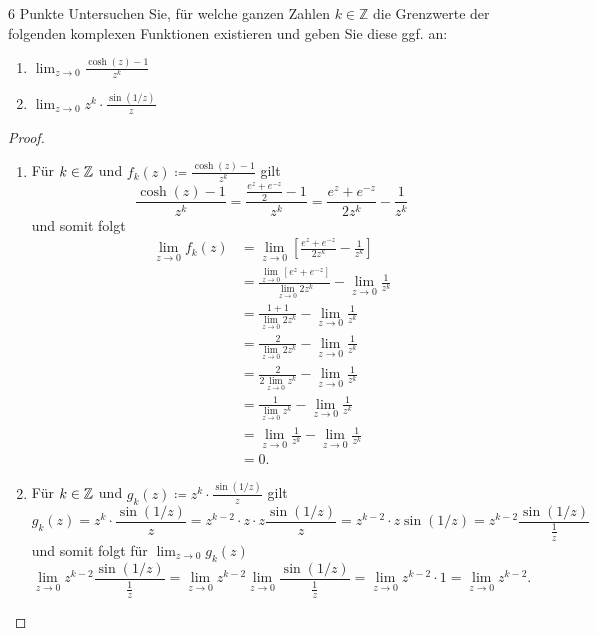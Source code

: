 \documentclass{problemset}
\begin{document}
\begin{problem}[Grenzwerte]{6 Punkte}
Untersuchen Sie, für welche ganzen Zahlen $k \in \mathbb{Z}$ die Grenzwerte der folgenden komplexen Funktionen existieren und geben Sie diese ggf. an:

\begin{enumerate}
	\item $\lim_{z \to 0} \frac{\cosh(z) - 1}{z^k}$

	\item $\lim_{z \to 0} z^k \cdot \frac{\sin(1/z)}{z}$
\end{enumerate}

\begin{proof}
	\leavevmode
	\begin{enumerate}
		\item Für $k \in \mathbb{Z}$ und $f_k(z) \coloneqq \frac{\cosh(z) - 1}{z^k}$ gilt \[
			      \frac{\cosh(z) - 1}{z^k} = \frac{\frac{e^z + e^{-z}}{2} - 1}{z^k} = \frac{e^z + e^{-z}}{2z^k} - \frac{1}{z^k}
		      \] und somit folgt
		      \begin{align*}
			      \lim_{z \to 0} f_k(z) & = \lim_{z \to 0} \left[ \frac{e^z + e^{-z}}{2z^k} - \frac{1}{z^k} \right]                               \\
			                            & = \frac{\lim_{z \to 0} \left[ e^z + e^{-z} \right]}{\lim_{z \to 0} 2z^k} - \lim_{z \to 0} \frac{1}{z^k} \\
			                            & = \frac{1 + 1}{\lim_{z \to 0} 2z^k} - \lim_{z \to 0} \frac{1}{z^k}                                      \\
			                            & = \frac{2}{\lim_{z \to 0} 2z^k} - \lim_{z \to 0} \frac{1}{z^k}                                          \\
			                            & = \frac{2}{2 \lim_{z \to 0} z^k} - \lim_{z \to 0} \frac{1}{z^k}                                         \\
			                            & = \frac{1}{\lim_{z \to 0} z^k} - \lim_{z \to 0} \frac{1}{z^k}                                           \\
			                            & = \lim_{z \to 0} \frac{1}{z^k} - \lim_{z \to 0} \frac{1}{z^k}                                           \\
			                            & = 0.
		      \end{align*}

		\item Für $k \in \mathbb{Z}$ und $g_k(z) \coloneqq z^k \cdot \frac{\sin(1/z)}{z}$ gilt \[
			      g_k(z) = z^k \cdot \frac{\sin(1/z)}{z} = z^{k - 2} \cdot z \cdot z \frac{\sin(1/z)}{z} = z^{k - 2} \cdot z \sin(1/z) = z^{k - 2} \frac{\sin(1/z)}{\frac{1}{z}}
		      \] und somit folgt für $\lim_{ z \to 0} g_k(z)$ \[
			      \lim_{z \to 0} z^{k - 2} \frac{\sin(1/z)}{\frac{1}{z}} = \lim_{z \to 0} z^{k - 2} \lim_{z \to 0} \frac{\sin(1/z)}{\frac{1}{z}} = \lim_{z \to 0} z^{k - 2} \cdot 1 = \lim_{z \to 0} z^{k - 2}.
		      \]


\end{enumerate}
\end{proof}
\end{problem}
\end{document}
